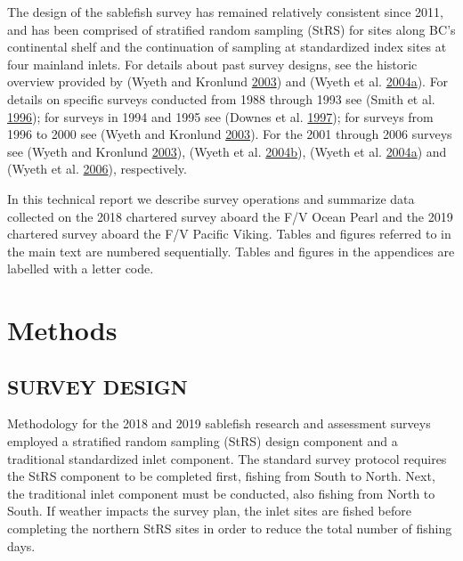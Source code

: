 \documentclass[12pt]{article}\usepackage[]{graphicx}\usepackage[]{color}
\begin{document}
The design of the sablefish survey has remained relatively consistent since 2011, and has been comprised of stratified random sampling (StRS) for sites along BC's continental shelf and the continuation of sampling at standardized index sites at four mainland inlets. For details about past survey designs, see the historic overview provided by (Wyeth and Kronlund \protect\hyperlink{ref-Wyeth2003}{2003}) and (Wyeth et al. \protect\hyperlink{ref-Wyeth2004b}{2004}\protect\hyperlink{ref-Wyeth2004b}{a}). For details on specific surveys conducted from 1988 through 1993 see (Smith et al. \protect\hyperlink{ref-Smith1996}{1996}); for surveys in 1994 and 1995 see (Downes et al. \protect\hyperlink{ref-Downes1997}{1997}); for surveys from 1996 to 2000 see (Wyeth and Kronlund \protect\hyperlink{ref-Wyeth2003}{2003}). For the 2001 through 2006 surveys see (Wyeth and Kronlund \protect\hyperlink{ref-Wyeth2003}{2003}), (Wyeth et al. \protect\hyperlink{ref-Wyeth2004a}{2004}\protect\hyperlink{ref-Wyeth2004a}{b}), (Wyeth et al. \protect\hyperlink{ref-Wyeth2004b}{2004}\protect\hyperlink{ref-Wyeth2004b}{a}) and (Wyeth et al. \protect\hyperlink{ref-Wyeth2006}{2006}), respectively.

In this technical report we describe survey operations and summarize data collected on the 2018 chartered survey aboard the F/V Ocean Pearl and the 2019 chartered survey aboard the F/V Pacific Viking. Tables and figures referred to in the main text are numbered sequentially. Tables and figures in the appendices are labelled with a letter code.

\hypertarget{methods}{%
\section{Methods}\label{methods}}

\hypertarget{survey-design}{%
\subsection{SURVEY DESIGN}\label{survey-design}}

Methodology for the 2018 and 2019 sablefish research and assessment surveys employed a stratified random sampling (StRS) design component and a traditional standardized inlet component. The standard survey protocol requires the StRS component to be completed first, fishing from South to North. Next, the traditional inlet component must be conducted, also fishing from North to South. If weather impacts the survey plan, the inlet sites are fished before completing the northern StRS sites in order to reduce the total number of fishing days.
\end{document}
